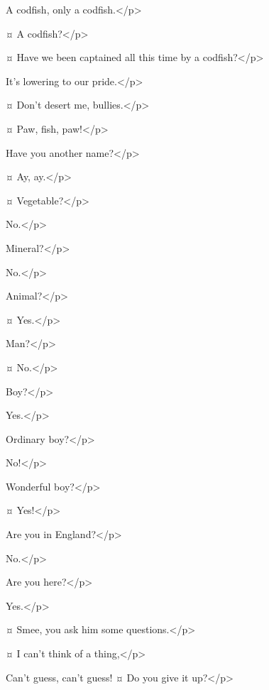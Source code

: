 \begin{drama}
\peterspeaks
A codfish, only a codfish.</p>

\hookspeaks {}¤
A codfish?</p>

\smeespeaks {}¤
Have we been captained all this time by a codfish?</p>

\starkeyspeaks
It's lowering to our pride.</p>

\hookspeaks {}¤
Don't desert me, bullies.</p>

\peterspeaks {}¤
Paw, fish, paw!</p>


\hookspeaks
Have you another name?</p>

\peterspeaks {}¤
Ay, ay.</p>

\hookspeaks {}¤
Vegetable?</p>

\peterspeaks
No.</p>

\hookspeaks
Mineral?</p>

\peterspeaks
No.</p>

\hookspeaks
Animal?</p>

\peterspeaks {}¤
Yes.</p>

\hookspeaks
Man?</p>

\peterspeaks {}¤
No.</p>

\hookspeaks
Boy?</p>

\peterspeaks
Yes.</p>

\hookspeaks
Ordinary boy?</p>

\peterspeaks
No!</p>

\hookspeaks
Wonderful boy?</p>

\peterspeaks {}¤
Yes!</p>

\hookspeaks
Are you in England?</p>

\peterspeaks
No.</p>

\hookspeaks
Are you here?</p>

\peterspeaks
Yes.</p>

\hookspeaks {}¤
Smee, you ask him some questions.</p>

\smeespeaks {}¤
I can't think of a thing,</p>

\peterspeaks
Can't guess, can't guess!
¤
Do you give it up?</p>


\end{drama}
